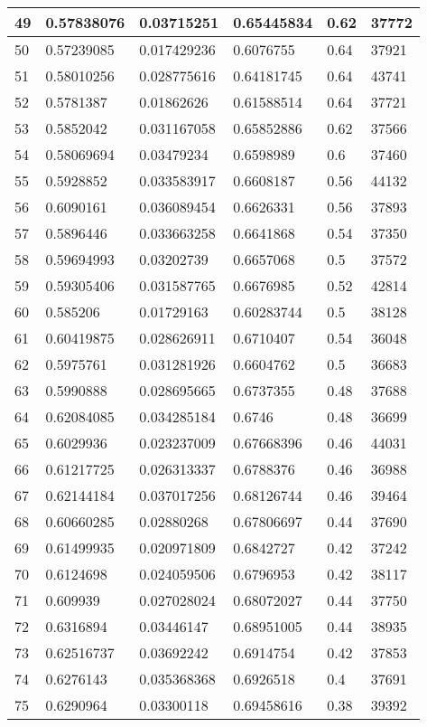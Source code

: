 \begin{longtable}{|l|l|l|l|l|l|}
49 & 0.57838076 & 0.03715251 & 0.65445834 & 0.62 & 37772 \\ \hline 
50 & 0.57239085 & 0.017429236 & 0.6076755 & 0.64 & 37921 \\ \hline 
51 & 0.58010256 & 0.028775616 & 0.64181745 & 0.64 & 43741 \\ \hline 
52 & 0.5781387 & 0.01862626 & 0.61588514 & 0.64 & 37721 \\ \hline 
53 & 0.5852042 & 0.031167058 & 0.65852886 & 0.62 & 37566 \\ \hline 
54 & 0.58069694 & 0.03479234 & 0.6598989 & 0.6 & 37460 \\ \hline 
55 & 0.5928852 & 0.033583917 & 0.6608187 & 0.56 & 44132 \\ \hline 
56 & 0.6090161 & 0.036089454 & 0.6626331 & 0.56 & 37893 \\ \hline 
57 & 0.5896446 & 0.033663258 & 0.6641868 & 0.54 & 37350 \\ \hline 
58 & 0.59694993 & 0.03202739 & 0.6657068 & 0.5 & 37572 \\ \hline 
59 & 0.59305406 & 0.031587765 & 0.6676985 & 0.52 & 42814 \\ \hline 
60 & 0.585206 & 0.01729163 & 0.60283744 & 0.5 & 38128 \\ \hline 
61 & 0.60419875 & 0.028626911 & 0.6710407 & 0.54 & 36048 \\ \hline 
62 & 0.5975761 & 0.031281926 & 0.6604762 & 0.5 & 36683 \\ \hline 
63 & 0.5990888 & 0.028695665 & 0.6737355 & 0.48 & 37688 \\ \hline 
64 & 0.62084085 & 0.034285184 & 0.6746 & 0.48 & 36699 \\ \hline 
65 & 0.6029936 & 0.023237009 & 0.67668396 & 0.46 & 44031 \\ \hline 
66 & 0.61217725 & 0.026313337 & 0.6788376 & 0.46 & 36988 \\ \hline 
67 & 0.62144184 & 0.037017256 & 0.68126744 & 0.46 & 39464 \\ \hline 
68 & 0.60660285 & 0.02880268 & 0.67806697 & 0.44 & 37690 \\ \hline 
69 & 0.61499935 & 0.020971809 & 0.6842727 & 0.42 & 37242 \\ \hline 
70 & 0.6124698 & 0.024059506 & 0.6796953 & 0.42 & 38117 \\ \hline 
71 & 0.609939 & 0.027028024 & 0.68072027 & 0.44 & 37750 \\ \hline 
72 & 0.6316894 & 0.03446147 & 0.68951005 & 0.44 & 38935 \\ \hline 
73 & 0.62516737 & 0.03692242 & 0.6914754 & 0.42 & 37853 \\ \hline 
74 & 0.6276143 & 0.035368368 & 0.6926518 & 0.4 & 37691 \\ \hline 
75 & 0.6290964 & 0.03300118 & 0.69458616 & 0.38 & 39392 \\ \hline 
\end{longtable}